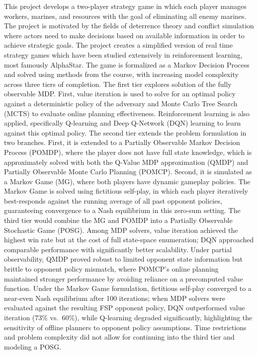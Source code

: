 \documentclass[conference]{IEEEtran}
\begin{document}
This project develops a two-player strategy game in which each player manages workers,
marines, and resources with the goal of eliminating all enemy marines. The project is motivated by the fields of deterrence theory and conflict simulation where actors need to make decisions based on available information in order to achieve strategic goals. The project creates a simplified version of real time strategy games which have been studied extensively in reinforcement learning, most famously AlphaStar. The game is formalized as a Markov Decision Process and solved using methods from the course, with
increasing model complexity across three tiers of completion. The first tier explores solution of the fully observable MDP. 
First, value iteration is used to solve for an optimal policy against a deterministic policy of the
adversary and Monte Carlo Tree Search (MCTS) to evaluate online planning effectiveness.
Reinforcement learning is also applied, specifically Q-learning and Deep Q-Network (DQN)
learning to learn against this optimal policy. The second tier extends the problem
formulation in two branches. First, it is extended to a Partially Observable Markov
Decision Process (POMDP), where the player does not have full state knowledge, which is
approximately solved with both the Q-Value MDP approximation (QMDP) and Partially
Observable Monte Carlo Planning (POMCP). Second, it is simulated as a Markov Game (MG),
where both players have dynamic gameplay policies. The Markov Game is solved using
fictitious self-play, in which each player iteratively best-responds against the running
average of all past opponent policies, guaranteeing convergence to a Nash equilibrium in
this zero-sum setting. The third tier would combine the MG and POMDP into a Partially
Observable Stochastic Game (POSG). Among MDP solvers, value iteration achieved the 
highest win rate but at the cost of full state-space enumeration; DQN approached 
comparable performance with significantly better scalability. Under partial observability, 
QMDP proved robust to limited opponent state information but brittle to opponent policy
mismatch, where POMCP's online planning maintained stronger performance by avoiding 
reliance on a precomputed value function. Under the Markov Game formulation, fictitious self-play converged to a near-even Nash equilibrium after 100 iterations; when MDP solvers were evaluated against the resulting FSP opponent policy, DQN outperformed value iteration (73\% vs.\ 60\%), while Q-learning degraded significantly, highlighting the sensitivity of offline planners to opponent policy assumptions.
Time restrictions and problem complexity did not allow for continuing into the third tier and modeling a POSG.
\end{document}
